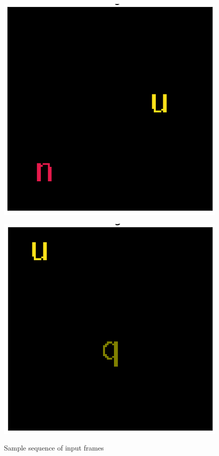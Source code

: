 \begin{figure}[!h]
\begin{minipage}{0.25\textwidth}
	\label{fig:frame-1}
\end{minipage}\hfill
\begin{minipage}{0.25\textwidth}
	\centering
	\includegraphics[width=0.9\linewidth]{"../img/visualization/experiment_run_20190917_022319/Frame 3"}
	\label{fig:frame-1}
\end{minipage}\hfill
\begin{minipage}{0.25\textwidth}
	\centering
	\includegraphics[width=0.9\linewidth]{"../img/visualization/experiment_run_20190917_022319/Frame 4"}
		\label{fig:frame-1}
\end{minipage}
\caption{Sample sequence of input frames} 
\label{fig:frame-seq}
\end{figure}


